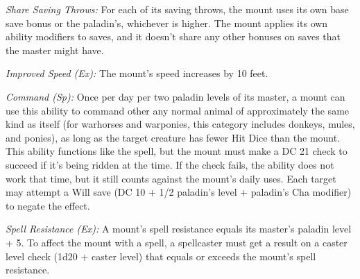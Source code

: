\textit{Share Saving Throws:} For each of its saving throws, the mount uses its 
own base save bonus or the paladin's, whichever is higher. The mount applies its 
own ability modifiers to saves, and it doesn't share any other bonuses on saves 
that the master might have.

\textit{Improved Speed (Ex):} The mount's speed increases by 10 feet.

\textit{Command (Sp):} Once per day per two paladin levels of its master, a mount 
can use this ability to command other any normal animal of approximately the same 
kind as itself (for warhorses and warponies, this category includes donkeys, mules, 
and ponies), as long as the target creature has fewer Hit Dice than the mount. 
This ability functions like the  spell, but the mount must make 
a DC 21  check to succeed if it's being ridden at the time. If the 
check fails, the ability does not work that time, but it still counts against the 
mount's daily uses. Each target may attempt a Will save (DC 10 + 1/2 paladin's 
level + paladin's Cha modifier) to negate the effect.

\textit{Spell Resistance (Ex): }A mount's spell resistance equals its master's 
paladin level + 5. To affect the mount with a spell, a spellcaster must get a result 
on a caster level check (1d20 + caster level) that equals or exceeds the mount's 
spell resistance.
